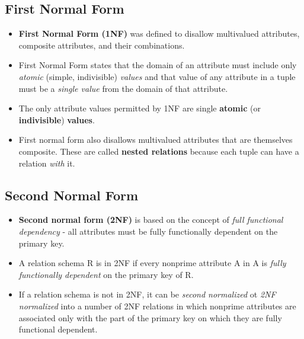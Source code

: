 \documentclass[10pt]{article}
\newcommand{\tf}{\textbf}
\newcommand{\ti}{\textit}
\begin{document}
\subsection{First Normal Form}

\begin{itemize}
	\item \tf{First Normal Form (1NF)} was defined to disallow multivalued attributes, composite attributes, and their combinations.
	\item First Normal Form states that the domain of an attribute must include only \ti{atomic} (simple, indivisible) \ti{values} and that value of any attribute in a tuple must be a \ti{single value} from the domain of that attribute.
	\item The only attribute values permitted by 1NF are single \tf{atomic} (or \tf{indivisible}) \tf{values}.
	\item First normal form also disallows multivalued attributes that are themselves composite. These are called \tf{nested relations} because each tuple can have a relation \ti{with} it.
\end{itemize}

\subsection{Second Normal Form}

\begin{itemize}
	\item \tf{Second normal form (2NF)} is based on the concept of \ti{full functional dependency} - all attributes must be fully functionally dependent on the primary key.
	\item A relation schema R is in 2NF if every nonprime attribute A in A is \ti{fully functionally dependent} on the primary key of R.
	\item If a relation schema is not in 2NF, it can be \ti{second normalized} ot \ti{2NF normalized} into a number of 2NF relations in which nonprime attributes are associated only with the part of the primary key on which they are fully functional dependent.  
\end{itemize}
\end{document}

